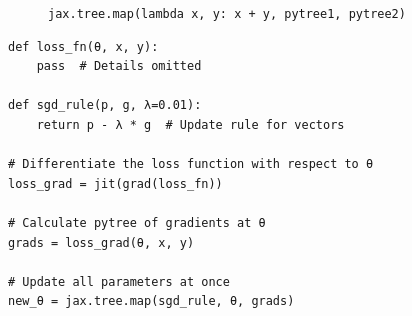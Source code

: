 \documentclass[xcolor=dvipsnames, 10pt]{beamer}
\begin{document}
\begin{frame}
\begin{figure}
\caption{\texttt{jax.tree.map(lambda x, y: x + y, pytree1, pytree2)}}
\end{figure}

\end{frame}


\begin{frame}[fragile]
    
    \begin{verbatim}
def loss_fn(θ, x, y):
    pass  # Details omitted

def sgd_rule(p, g, λ=0.01): 
    return p - λ * g  # Update rule for vectors

# Differentiate the loss function with respect to θ
loss_grad = jit(grad(loss_fn))

# Calculate pytree of gradients at θ
grads = loss_grad(θ, x, y)

# Update all parameters at once
new_θ = jax.tree.map(sgd_rule, θ, grads)
    \end{verbatim}

\end{frame}
\end{document}
